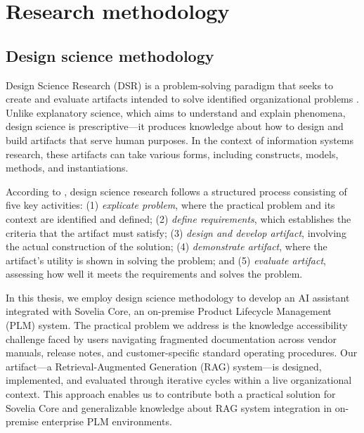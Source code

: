 \chapter{Research methodology}
\label{ch:research-methodology}


\section{Design science methodology}
\label{sec:design-science-methodology}

Design Science Research (DSR) is a problem-solving paradigm that seeks to create and evaluate artifacts intended to solve identified organizational problems \parencite{johannesson_introduction_2021}. Unlike explanatory science, which aims to understand and explain phenomena, design science is prescriptive—it produces knowledge about how to design and build artifacts that serve human purposes. In the context of information systems research, these artifacts can take various forms, including constructs, models, methods, and instantiations.

According to \textcite{johannesson_introduction_2021}, design science research follows a structured process consisting of five key activities: (1) \emph{explicate problem}, where the practical problem and its context are identified and defined; (2) \emph{define requirements}, which establishes the criteria that the artifact must satisfy; (3) \emph{design and develop artifact}, involving the actual construction of the solution; (4) \emph{demonstrate artifact}, where the artifact's utility is shown in solving the problem; and (5) \emph{evaluate artifact}, assessing how well it meets the requirements and solves the problem.

In this thesis, we employ design science methodology to develop an AI assistant integrated with Sovelia Core, an on-premise Product Lifecycle Management (PLM) system. The practical problem we address is the knowledge accessibility challenge faced by users navigating fragmented documentation across vendor manuals, release notes, and customer-specific standard operating procedures. Our artifact—a Retrieval-Augmented Generation (RAG) system—is designed, implemented, and evaluated through iterative cycles within a live organizational context. This approach enables us to contribute both a practical solution for Sovelia Core and generalizable knowledge about RAG system integration in on-premise enterprise PLM environments.

